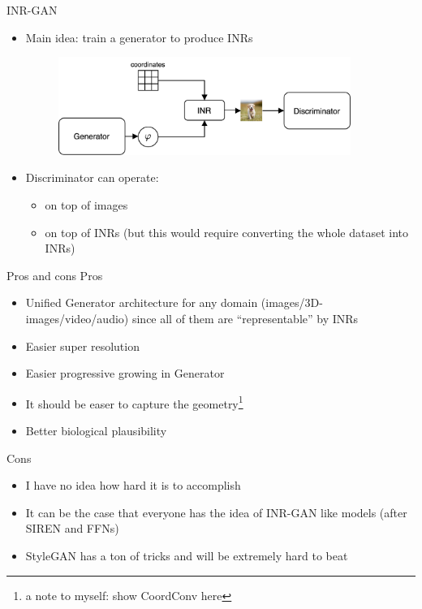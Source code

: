 \documentclass[10pt, handout]{beamer}
\begin{document}
\begin{frame}{INR-GAN}
\begin{itemize}
    \item\pause Main idea: train a generator to produce INRs
    \begin{figure}
        \centering
        \includegraphics[width=0.9\textwidth]{images/inr-gan}
    \end{figure}
    \item\pause Discriminator can operate:
    \begin{itemize}
        \item\pause on top of images
        \item\pause on top of INRs (but this would require converting the whole dataset into INRs)
    \end{itemize}
\end{itemize}
\end{frame}


\begin{frame}{Pros and cons}
Pros
\begin{itemize}
    \item\pause Unified Generator architecture for any domain (images/3D-images/video/audio) since all of them are ``representable'' by INRs
    \item\pause Easier super resolution
    \item\pause Easier progressive growing in Generator
    \item\pause It should be easer to capture the geometry\footnote{a note to myself: show CoordConv here}
    \item\pause Better biological plausibility
\end{itemize}

Cons
\begin{itemize}
    \item\pause I have no idea how hard it is to accomplish
    \item\pause It can be the case that everyone has the idea of INR-GAN like models (after SIREN and FFNs)
    \item\pause StyleGAN has a ton of tricks and will be extremely hard to beat
\end{itemize}
\end{frame}
\end{document}
